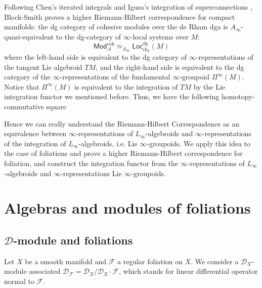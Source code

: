 \documentclass[12pt]{amsart}
\theoremstyle{definition}
\theoremstyle{remark}
\numberwithin{equation}{section}
\newcommand{\CF}{{\mathcal F}}
\newcommand{\D}{{\mathcal D}}
\newcommand{\1}{{\mathbb{1}}}
\newcommand{\Mod}{\mathsf{Mod}}
\newcommand{\rep}{\mathsf{Rep}}
\newcommand{\Loc}{\mathsf{Loc}}
\newcommand{\dg}{{\operatorname{dg}}}
\newcommand{\coh}{{\operatorname{coh}}}
\newcommand{\ch}{\operatorname{ch}}
\begin{document}
Following Chen's iterated integrals \cite{Che77}\cite{Gug77} and Igusa's integration of superconnections \cite{Igu09}, Block-Smith \cite{BS14} proves a higher Riemann-Hilbert correspondence for compact manifolds: the dg category of cohesive modules over the de Rham dga is $A_{\infty}$-quasi-equivalent to the dg-category of $\infty$-local systems over $M$:
\begin{equation*}
    \Mod^{\coh}_{\mathcal{A}} \simeq_{A_{\infty}} \Loc^{\dg}_{\ch_k}(M)
\end{equation*}
where the left-hand side is equivalent to the dg category of $\infty$-representations of the tangent Lie algebroid $TM$, and the right-hand side is equivalent to the dg category of the $\infty$-representations of the fundamental $\infty$-groupoid $\Pi^{\infty}(M)$. Notice that $\Pi^{\infty}(M)$ is equivalent to the integration of $TM$ by the Lie integration functor we mentioned before. Thus, we have the following homotopy-commutative square

\begin{center}
\end{center}
Hence we can really understand the Riemann-Hilbert Correspondence as an equivalence between $\infty$-representations of $L_{\infty}$-algebroids and $\infty$-representations of the integration of $L_{\infty}$-algebroids, i.e. Lie $\infty$-groupoids. 
We apply this idea to the case of foliations and prove a higher Riemann-Hilbert correspondence for foliation, and construct the integration functor from the $\infty$-representations of $L_{\infty}$-algebroids and $\infty$-representations Lie $\infty$-groupoids.

\section{Algebras and modules of foliations}
\subsection{$\mathcal{D}$-module and foliations}
Let $X$ be a smooth manifold and $\CF$ a regular foliation on $X$. We consider a $\D_X$-module\index{$\D_X$-module} associated $\D_{\CF} = \D_X / \D_X\cdot \CF $, which stands for linear differential operator normal to $\CF$. 
\end{document}
